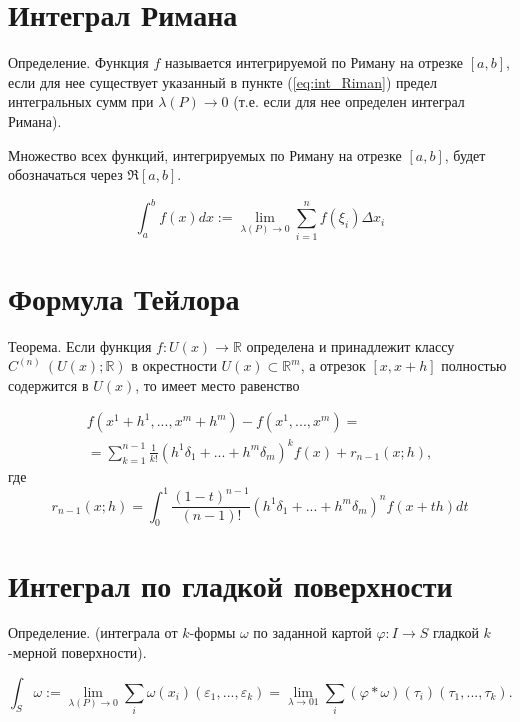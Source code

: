 \documentclass[a4paper, 12pt]{article} %
\begin{document}
\clearpage

\section*{Интеграл Римана}

Определение. Функция $f$ называется интегрируемой по Риману на отрезке $[a, b]$, если для нее существует указанный в пункте (\ref{eq:int_Riman}) предел интегральных сумм при $\lambda (P) \to 0$ (т.е. если для нее определен интеграл Римана).

Множество всех функций, интегрируемых по Риману на отрезке $[a, b]$, будет обозначаться через $\Re [a, b]$.

\[
    \int^b_a f(x) dx := \lim_{\lambda(P) \to 0} \sum^n_{i = 1} f(\xi_i) \Delta x_i
    \label{eq:int_Riman}
\]

\clearpage

\section*{Формула Тейлора}

Теорема. Если функция $f: U(x) \to \mathbb{R}$ определена и принадлежит классу $C^{(n)} \ (U(x); \mathbb{R})$ в окрестности $U(x) \subset \mathbb{R}^m$, а отрезок $[x, x + h]$ полностью содержится в $U(x)$, то имеет место равенство

\begin{eqnarray*}
    f(x^1 + h^1, ..., x^m+h^m) - f(x^1, ...,x^m) = \\ = \sum^{n - 1}_{k = 1} \frac{1}{k!} (h^1 \delta_1 + ... + h^m \delta_m)^k f(x) + r_{n - 1}(x; h),
\end{eqnarray*}
где
\begin{equation}
    r_{n-1}(x;h) = \int^1_0 \frac{(1-t)^{n - 1}}{(n - 1)!} (h^1 \delta_1 + ... + h^m \delta_m)^n f(x + th) dt
\end{equation}

\clearpage
\section*{Интеграл по гладкой поверхности}
Определение. (интеграла от $k$-формы $\omega$ по заданной картой $\varphi: I \to S$ гладкой $k$-мерной поверхности).

\[
    \int_S \omega := \lim_{\lambda (P) \to 0} \sum_i \omega (x_i)(\varepsilon_1, ..., \varepsilon_k) = \lim_{\lambda \to 01} \sum_i (\varphi * \omega)(\tau_i)(\tau_1, ..., \tau_k).
    \label{eq:int_by_smooth_surface_one}
\]
\end{document}
